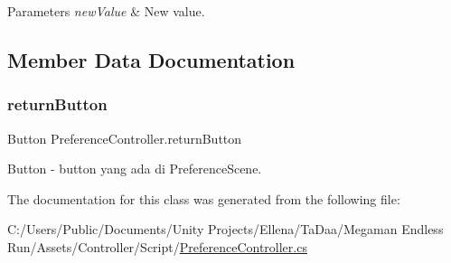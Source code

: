 \begin{DoxyParams}{Parameters}
{\em new\+Value} & New value.\\
\hline
\end{DoxyParams}


\subsection{Member Data Documentation}
\hypertarget{class_preference_controller_a1eae6170b41b81919c9ecf14c0ecb86c}{}\label{class_preference_controller_a1eae6170b41b81919c9ecf14c0ecb86c} 
\subsubsection{\texorpdfstring{return\+Button}{returnButton}}
{\footnotesize\ttfamily Button Preference\+Controller.\+return\+Button}



Button -\/ button yang ada di Preference\+Scene. 



The documentation for this class was generated from the following file\+:\begin{DoxyCompactItemize}
\item 
C\+:/\+Users/\+Public/\+Documents/\+Unity Projects/\+Ellena/\+Ta\+Daa/\+Megaman Endless Run/\+Assets/\+Controller/\+Script/\hyperlink{_preference_controller_8cs}{Preference\+Controller.\+cs}\end{DoxyCompactItemize}
